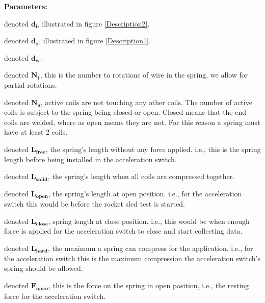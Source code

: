 \documentclass[10pt]{article}
\begin{document}
		\noindent \textbf{Parameters:}
		\begin{description}[leftmargin=!,labelwidth=\widthof{\bfseries Outer diameter:}]
			\item [Inner diameter:] denoted $\mathbf{d_{i}}$, illustrated in figure \ref{Description2}.
			
			\item [Outer diameter:] denoted $\mathbf{d_{o}}$, illustrated in figure \ref{Description1}.
			
			\item [Wire diameter:] denoted $\mathbf{d_{w}}$.
			
			\item[Total coils:] denoted $\mathbf{N_{t}}$, this is the number to rotations of wire in the spring, we allow for partial rotations.
			
			\item[Active coils:] denoted $\mathbf{N_{a}}$, active coils are not touching any other coils. The number of active coils is subject to the spring being closed or open. Closed means that the end coils are welded, where as open means they are not. For this reason a spring must have at least 2 coils.

			\item[Free length:] denoted $\mathbf{L_{free}}$, the spring's length without any force applied. i.e., this is the spring length before being installed in the acceleration switch.
			
			\item[Solid length:] denoted $\mathbf{L_{solid}}$, the spring's length when all coils are compressed together.
			\item[Open length:] denoted $\mathbf{L_{open}}$, the spring's length at open position. i.e., for the acceleration switch this would be before the rocket sled test is started. 
			
			\item[Close length:] denoted $\mathbf{L_{close}}$, spring length at close position. i.e., this would be when enough force is applied for the acceleration switch to close and start collecting data.
			
			\item[Hard length:] denoted $\mathbf{L_{hard}}$, the maximum a spring can compress for the application. i.e., for the acceleration switch this is the maximum compression the acceleration switch's spring should be allowed. 
			
			\item[Open force:] denoted $\mathbf{F_{open}}$, this is the force on the spring in open position, i.e., the resting force for the acceleration switch.			
			

\end{description}
\end{document}
